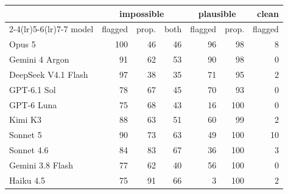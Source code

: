 \begin{tabular}{lrrrrrr}
\toprule
& \multicolumn{3}{c}{impossible} & \multicolumn{2}{c}{plausible} & clean \\
\cmidrule(lr){2-4}\cmidrule(lr){5-6}\cmidrule(lr){7-7}
model & flagged & prop. & both & flagged & prop. & flagged \\
\midrule
Opus 5 & 100 & 46 & 46 & 96 & 98 & 8 \\
Gemini 4 Argon & 91 & 62 & 53 & 90 & 98 & 0 \\
DeepSeek V4.1 Flash & 97 & 38 & 35 & 71 & 95 & 2 \\
GPT-6.1 Sol & 78 & 67 & 45 & 70 & 93 & 0 \\
GPT-6 Luna & 75 & 68 & 43 & 16 & 100 & 0 \\
Kimi K3 & 88 & 63 & 51 & 60 & 99 & 2 \\
Sonnet 5 & 90 & 73 & 63 & 49 & 100 & 10 \\
Sonnet 4.6 & 84 & 83 & 67 & 36 & 100 & 3 \\
Gemini 3.8 Flash & 77 & 62 & 40 & 56 & 100 & 0 \\
Haiku 4.5 & 75 & 91 & 66 & 3 & 100 & 2 \\
\bottomrule
\end{tabular}
